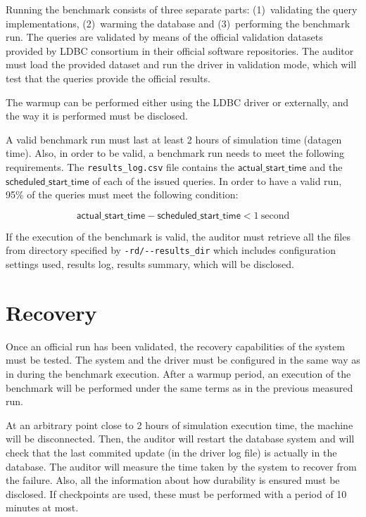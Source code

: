 Running the benchmark consists of three separate parts: (1)~validating the query
implementations, (2)~warming the database and (3)~performing the benchmark run. The
queries are validated by means of the official validation datasets provided by
LDBC consortium in their official software repositories. The auditor must load
the provided dataset and run the driver in validation mode, which will test
that the queries provide the official results.

The warmup can be performed either using the LDBC driver or externally, and the
way it is performed must be disclosed.

A valid benchmark run must last at least 2 hours of simulation time (datagen
time).  Also, in order to be valid, a benchmark run needs to meet the following
requirements. The \texttt{results\_log.csv} file contains the $\mathsf{actual\_start\_time}$ and the $\mathsf{scheduled\_start\_time}$ of each of the issued queries.  In order to have a valid
run, 95\% of the queries must meet the following condition:

\begin{equation*}
\mathsf{actual\_start\_time} - \mathsf{scheduled\_start\_time} < 1\
\mathrm{second}
\end{equation*}

If the execution of the benchmark is valid, the auditor must retrieve all the
files from directory specified by \verb|-rd/--results_dir| which includes
configuration settings used, results log, results summary, which will be
disclosed.


\section{Recovery}

Once an official run has been validated, the recovery capabilities of the
system must be tested. The system and the driver must be configured in the
same way as in during the benchmark execution. After a warmup period, an
execution of the benchmark will be performed under the same terms as in the
previous measured run.

At an arbitrary point close to 2 hours of simulation execution time, the machine
will be disconnected.  Then, the auditor will restart the database system and
will check that the last commited update (in the driver log file) is actually
in the database. The auditor will measure the time taken by the system to
recover from the failure. Also, all the information about how durability is
ensured must be disclosed. If checkpoints are used, these must be performed
with a period of 10 minutes at most.

